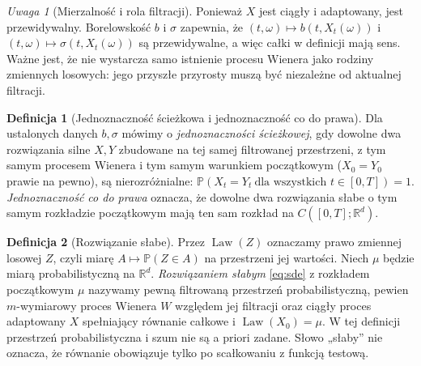 \documentclass[11pt,a4paper,oneside]{report}
\numberwithin{equation}{chapter}
\theoremstyle{plain}
\theoremstyle{definition}
\newtheorem{definicja}{Definicja}[chapter]
\theoremstyle{remark}
\newtheorem{uwaga}{Uwaga}[chapter]
\newcommand{\R}{\mathbb{R}}
\newcommand{\Prob}{\mathbb{P}}
\newcommand{\Law}{\operatorname{Law}}
\begin{document}
\begin{uwaga}[Mierzalność i rola filtracji]
Ponieważ $X$ jest ciągły i adaptowany, jest przewidywalny.
Borelowskość $b$ i $\sigma$ zapewnia, że
$(t,\omega)\mapsto b(t,X_t(\omega))$ i
$(t,\omega)\mapsto\sigma(t,X_t(\omega))$ są przewidywalne,
a więc całki w definicji mają sens. Ważne jest, że nie wystarcza
samo istnienie procesu Wienera jako rodziny zmiennych losowych:
jego przyszłe przyrosty muszą być niezależne od aktualnej filtracji.
\end{uwaga}

\begin{definicja}[Jednoznaczność ścieżkowa i jednoznaczność co do prawa]\label{def:volIII:05:02}
Dla ustalonych danych $b,\sigma$ mówimy o
\emph{jednoznaczności ścieżkowej}, gdy dowolne dwa rozwiązania
silne $X,Y$ zbudowane na tej samej filtrowanej przestrzeni,
z tym samym procesem Wienera i tym samym warunkiem początkowym
($X_0=Y_0$ prawie na pewno), są nierozróżnialne:
$\Prob(X_t=Y_t\ \text{dla wszystkich }t\in[0,T])=1$.
\emph{Jednoznaczność co do prawa} oznacza, że dowolne dwa
rozwiązania słabe o tym samym rozkładzie początkowym mają
ten sam rozkład na $C([0,T];\R^d)$.
\end{definicja}

\begin{definicja}[Rozwiązanie słabe]\label{def:volIII:05:03}
Przez $\Law(Z)$ oznaczamy prawo zmiennej losowej $Z$,
czyli miarę $A\mapsto\Prob(Z\in A)$ na przestrzeni jej wartości.
Niech $\mu$ będzie miarą probabilistyczną na $\R^d$.
\emph{Rozwiązaniem słabym} \eqref{eq:sde} z rozkładem
początkowym $\mu$ nazywamy pewną filtrowaną przestrzeń
probabilistyczną, pewien $m$-wymiarowy proces Wienera $W$
względem jej filtracji oraz ciągły proces adaptowany $X$
spełniający równanie całkowe i $\Law(X_0)=\mu$.
W tej definicji przestrzeń probabilistyczna i szum nie są
a priori zadane. Słowo „słaby” nie oznacza, że równanie
obowiązuje tylko po scałkowaniu z funkcją testową.
\end{definicja}
\end{document}
